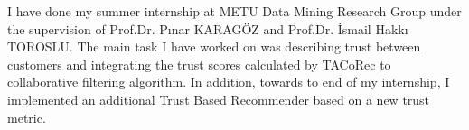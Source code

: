 
I have done my summer internship at METU Data Mining Research Group under the supervision of Prof.Dr. Pınar KARAGÖZ and Prof.Dr. İsmail Hakkı TOROSLU. The main task I have worked on was describing trust between customers and integrating the trust scores calculated by TACoRec\cite{Tacorec} to collaborative filtering algorithm. In addition, towards to end of my internship, I implemented an additional Trust Based Recommender based on a new trust metric.